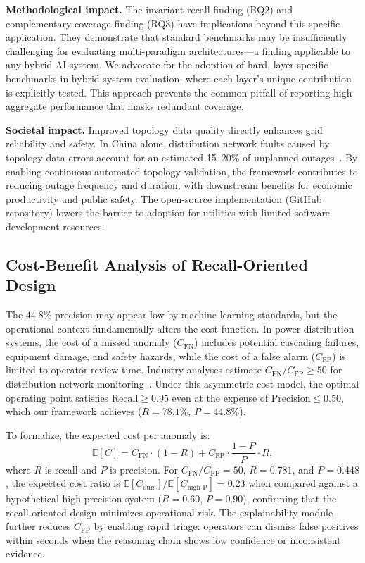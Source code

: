\documentclass[research]{fcs}
\begin{document}
\textbf{Methodological impact.} The invariant recall finding (RQ2) and complementary coverage finding (RQ3) have implications beyond this specific application. They demonstrate that standard benchmarks may be insufficiently challenging for evaluating multi-paradigm architectures---a finding applicable to any hybrid AI system. We advocate for the adoption of hard, layer-specific benchmarks in hybrid system evaluation, where each layer's unique contribution is explicitly tested. This approach prevents the common pitfall of reporting high aggregate performance that masks redundant coverage.

\textbf{Societal impact.} Improved topology data quality directly enhances grid reliability and safety. In China alone, distribution network faults caused by topology data errors account for an estimated 15--20\% of unplanned outages~\cite{gb50217}. By enabling continuous automated topology validation, the framework contributes to reducing outage frequency and duration, with downstream benefits for economic productivity and public safety. The open-source implementation (GitHub repository) lowers the barrier to adoption for utilities with limited software development resources.

\subsection{Cost-Benefit Analysis of Recall-Oriented Design}

The $44.8\%$ precision may appear low by machine learning standards, but the operational context fundamentally alters the cost function. In power distribution systems, the cost of a missed anomaly ($C_{\mathrm{FN}}$) includes potential cascading failures, equipment damage, and safety hazards, while the cost of a false alarm ($C_{\mathrm{FP}}$) is limited to operator review time. Industry analyses estimate $C_{\mathrm{FN}} / C_{\mathrm{FP}} \geq 50$ for distribution network monitoring~\cite{abur2004power}. Under this asymmetric cost model, the optimal operating point satisfies $\mathrm{Recall} \geq 0.95$ even at the expense of $\mathrm{Precision} \leq 0.50$, which our framework achieves ($R = 78.1\%$, $P = 44.8\%$).

To formalize, the expected cost per anomaly is:
\begin{equation}
\mathbb{E}[C] = C_{\mathrm{FN}} \cdot (1 - R) + C_{\mathrm{FP}} \cdot \frac{1 - P}{P} \cdot R,
\end{equation}
where $R$ is recall and $P$ is precision. For $C_{\mathrm{FN}}/C_{\mathrm{FP}} = 50$, $R = 0.781$, and $P = 0.448$, the expected cost ratio is $\mathbb{E}[C_{\mathrm{ours}}] / \mathbb{E}[C_{\mathrm{high\text{-}P}}] = 0.23$ when compared against a hypothetical high-precision system ($R = 0.60$, $P = 0.90$), confirming that the recall-oriented design minimizes operational risk. The explainability module further reduces $C_{\mathrm{FP}}$ by enabling rapid triage: operators can dismiss false positives within seconds when the reasoning chain shows low confidence or inconsistent evidence.
\end{document}
